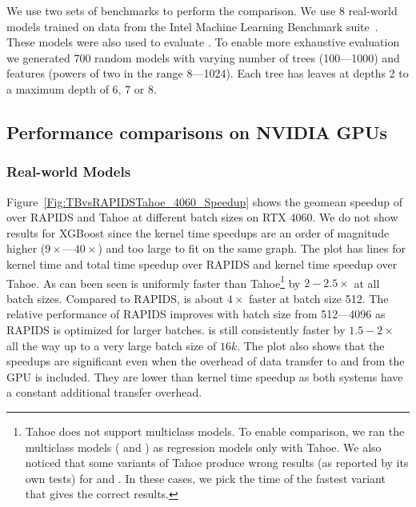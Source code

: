 We use two sets of benchmarks to perform the comparison.
We use 8 real-world models trained on data from the Intel Machine 
Learning Benchmark suite~\cite{MLBenchmarks}. These models were also
used to evaluate \TreebeardOLD{}\cite{Treebeard}.
To enable more exhaustive evaluation we generated 700 random models with
varying number of trees (100---1000) and features (powers of two in the range 8---1024). 
Each tree has leaves at depths 2 to a maximum depth of 6, 7 or 8.

\subsection{Performance comparisons on NVIDIA GPUs}

\subsubsection*{Real-world Models}
Figure~\ref{Fig:TBvsRAPIDSTahoe_4060_Speedup} shows the geomean speedup of \Treebeard{} over RAPIDS and Tahoe at different batch sizes on RTX 4060. 
We do not show results for XGBoost since the kernel time speedups are an order of magnitude higher ($9\times$---$40\times$) and too large to fit on the same graph.  
The plot has lines for kernel time and total time speedup over RAPIDS and kernel time speedup over Tahoe. As can been seen 
\Treebeard{} is uniformly faster than Tahoe{\footnote{Tahoe does not support multiclass models. To enable comparison, we ran 
the multiclass models ( and ) as regression models only with Tahoe. We also noticed that some variants
of Tahoe produce wrong results (as reported by its own tests) for  and . In these cases, we pick the 
time of the fastest variant that gives the correct results.}} by $2-2.5\times$ at all batch sizes. 
Compared to RAPIDS, \Treebeard{} is about $4\times$ faster at batch size 512. The relative performance of RAPIDS improves 
with batch size from 512---4096 as RAPIDS is optimized for larger batches. \Treebeard{} is still consistently faster by $1.5-2\times$ all the way up to a very large batch size of $16k$. 
The plot also shows that the speedups are significant even when the overhead of data transfer to and from the GPU
is included. They are lower than kernel time speedup as both systems have a constant additional transfer overhead.


